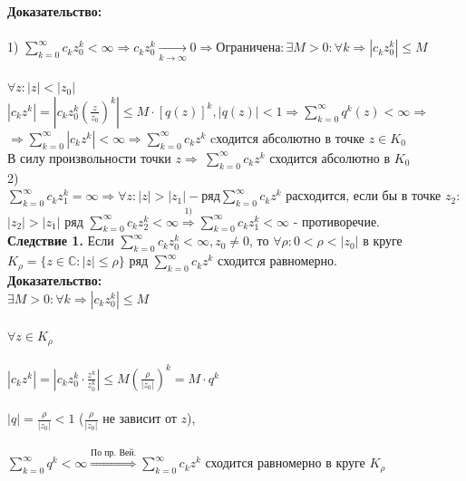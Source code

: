 \documentclass[a4paper,12pt]{article} %
\begin{document}
\textbf{Доказательство:} \\
\ \\
1) $\sum\limits_{k = 0}^\infty c_k z_0^k < \infty \Rightarrow c_k z_0^k \underset{k \to \infty}{\longrightarrow} 0 \Rightarrow \text{Ограничена:} \,  \exists M > 0: \forall k \Rightarrow |c_k z_0^k| \leqslant M$ \\
\ \\
$ \forall z: |z| < |z_0| $ \\
$ |c_k z^k| = | c_k z_0^k  \left(  \frac{z}{z_0} \right)^k | \leqslant M \cdot \left[ q(z) \right]^k, |q(z)| < 1 \Rightarrow \sum\limits_{k = 0}^\infty q^k(z) < \infty \Rightarrow
$\\
$
\Rightarrow \sum\limits_{k = 0}^\infty |c_k z^k| < \infty \Rightarrow \sum\limits_{k = 0}^\infty c_k z^k 
$ cходится абсолютно в точке $z \in K_0$\\
В силу произвольности точки $z \Rightarrow ~ \sum\limits_{k = 0}^\infty c_k z^k$ сходится абсолютно в $K_0$   
\ \\
2) $
\sum\limits_{k = 0}^\infty c_k z_1^k = \infty \Rightarrow \forall z: |z| > |z_1| - \text{ряд} \sum\limits_{k = 0}^\infty c_k z^k \text{ расходится, если бы в точке } z_2: 
$\\
$
|z_2| > |z_1| \text{ ряд } \sum\limits_{k = 0}^\infty c_k z_2^k < \infty \stackrel{1)}{\Rightarrow} \sum\limits_{k = 0}^\infty c_k z_1^k < \infty
$ - противоречие. \\
\textbf{Следствие 1. } Если $\sum\limits_{k = 0}^\infty c_k z_0^k < \infty, z_0 \neq 0$, то $\forall \rho: 0 < \rho < |z_0|$ в круге $K_{\rho} = \{z \in \mathbb{C} : |z| \leqslant \rho \} \text{ ряд } \sum\limits_{k = 0}^\infty c_k z^k$ сходится равномерно. \\
\textbf{Доказательство:} \\
$
\exists M > 0: \forall k \Rightarrow |c_k z_0^k| \leqslant M
$ \\
\ \\
$ \forall z \in K_{\rho} $\\
\ \\
$
|c_k z^k| = |c_k z_0^k \cdot \frac{z^k}{z_0^k} | \leqslant M \left( \frac{\rho}{|z_0|} \right)^k = M \cdot q^k
$ \\
\ \\
$ |q| = \frac{\rho}{|z_0|} < 1 $ ($\frac{\rho}{|z_0|}$ не зависит от $z$), \\
\ \\
$\sum\limits_{k = 0}^\infty q^k < \infty \stackrel{\text{По пр. Вей.}}{\Rightarrow} \sum\limits_{k = 0}^\infty c_k z^k$ сходится равномерно в круге  $K_{\rho}$ \\
\end{document}
